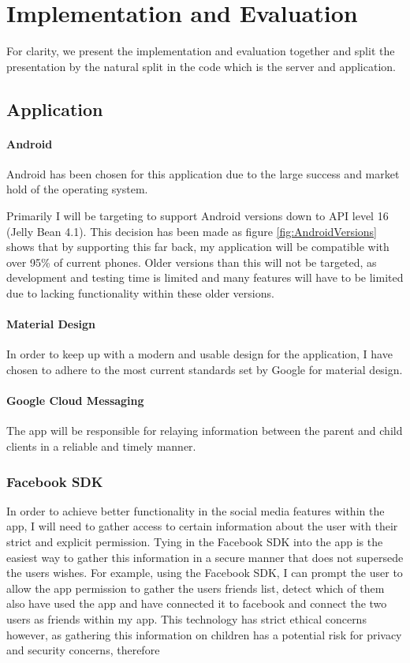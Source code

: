
% 


\chapter{Implementation and Evaluation}

For clarity, we present the implementation and evaluation together and split the presentation by the natural split in the code which is the server and application.

\section{Application}
\subsubsection{Android}
Android has been chosen for this application due to the large success and market hold of the operating system.

Primarily I will be targeting to support Android versions down to API level 16 (Jelly Bean 4.1).
This decision has been made as figure \ref{fig:AndroidVersions} shows that by supporting this far back, my application will be compatible with over 95\% of current phones. 
Older versions than this will not be targeted, as development and testing time is limited and many features will have to be limited due to lacking functionality within these older versions.

\subsubsection{Material Design}
In order to keep up with a modern and usable design for the application, I have chosen to adhere to the most current standards set by Google for material design.

\subsubsection{Google Cloud Messaging}
The app will be responsible for relaying information between the parent and child clients in a reliable and timely manner.

\subsection{Facebook SDK}
In order to achieve better functionality in the social media features within the app, I will need to gather access to certain information about the user with their strict and explicit permission. 
Tying in the Facebook SDK into the app is the easiest way to gather this information in a secure manner that does not supersede the users wishes.
For example, using the Facebook SDK, I can prompt the user to allow the app permission to gather the users friends list, detect which of them also have used the app and have connected it to facebook and connect the two users as friends within my app.
This technology has strict ethical concerns however, as gathering this information on children has a potential risk for privacy and security concerns, therefore

